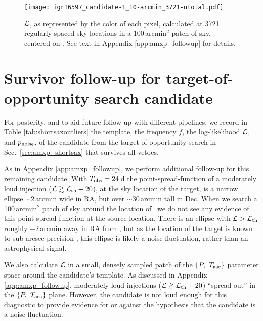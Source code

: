 \begin{subappendices}
\begin{figure}
\centering
\texttt{[image: igr16597\_candidate-1\_10-arcmin\_3721-ntotal.pdf]}
\caption{$\mathcal{L}$, as represented by the color of each pixel, calculated at 3721 regularly spaced sky locations in a 100\,arcmin$^2$ patch of sky, centered on \igrb. See text in Appendix \ref{app:amxp_followup} for details.}
\label{fig:amxp_skymap}
\end{figure}

\newpage
\section{Survivor follow-up for target-of-opportunity search candidate \label{app:amxp_shortsax_followup}}
For posterity, and to aid future follow-up with different pipelines, we record in Table \ref{tab:shortsaxoutliers} the template, the frequency $f$, the log-likelihood $\mathcal{L}$, and $p_{\rm noise}$, of the candidate from the target-of-opportunity search in Sec.~\ref{sec:amxp_shortsax} that survives all vetoes. 

As in Appendix \ref{app:amxp_followup}, we perform additional follow-up for this remaining candidate. With $T_{\rm obs}=24\,$d the point-spread-function of a moderately loud injection ($\mathcal{L} \gtrsim \mathcal{L}_{\rm th} + 20$), at the sky location of the target, is a narrow ellipse $\sim2\,$arcmin wide in RA, but over $\sim30\,$arcmin tall in Dec. When we search a 100\,arcmin$^2$ patch of sky around the location of \sax\ we do not see any evidence of this point-spread-function at the source location. There is an ellipse with $\mathcal{L} > \mathcal{L}_{\rm th}$ roughly $-2\,$arcmin away in RA from \sax, but as the location of the target is known to sub-arcsec precision \cite{Bult2020}, this ellipse is likely a noise fluctuation, rather than an astrophysical signal.

We also calculate $\mathcal{L}$ in a small, densely sampled patch of the $\{P,\ \tasc\}$ parameter space around the candidate's template. As discussed in Appendix \ref{app:amxp_followup}, moderately loud injections ($\mathcal{L} \gtrsim \mathcal{L}_{\rm th} + 20$) ``spread out'' in the $\{P,\ \tasc\}$ plane. However, the candidate is not loud enough for this diagnostic to provide evidence for or against the hypothesis that the candidate is a noise fluctuation.


\end{subappendices}
